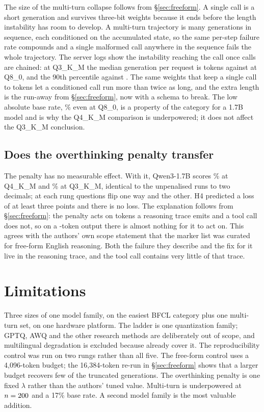 \documentclass[11pt]{article}
\newcommand{\bfcl}{BFCL}
\newcommand{\qm}{Qwen3-1.7B}
\begin{document}
The size of the multi-turn collapse follows from \S\ref{sec:freeform}. A single call is a short generation and survives three-bit weights because it ends before the length instability has room to develop. A multi-turn trajectory is many generations in sequence, each conditioned on the accumulated state, so the same per-step failure rate compounds and a single malformed call anywhere in the sequence fails the whole trajectory. The server logs show the instability reaching the call once calls are chained: at Q3\_K\_M the median generation per request is \qtMtNgenMedThree{} tokens against \qtMtNgenMedEight{} at Q8\_0, and the 90th percentile \qtMtNgenPninezeroThree{} against \qtMtNgenPninezeroEight{}. The same weights that keep a single call to \qtToolNgenMedThree{} tokens let a conditioned call run more than twice as long, and the extra length is the run-away from \S\ref{sec:freeform}, now with a schema to break. The low absolute base rate, \qtMtAccEight{}\% even at Q8\_0, is a property of the category for a 1.7B model and is why the Q4\_K\_M comparison is underpowered; it does not affect the Q3\_K\_M conclusion.

\subsection{Does the overthinking penalty transfer}

The penalty has no measurable effect. With it, \qm{} scores \qtHfourAccFour{}\% at Q4\_K\_M and \qtHfourAccThree{}\% at Q3\_K\_M, identical to the unpenalised runs to two decimals; at each rung \qtHfourLostFour{} questions flip one way and \qtHfourGainedFour{} the other. H4 predicted a loss of at least three points and there is no loss. The explanation follows from \S\ref{sec:freeform}: the penalty acts on tokens a reasoning trace emits and a tool call does not, so on a \qtToolNgenMedThree{}-token output there is almost nothing for it to act on. This agrees with the authors' own scope statement that the marker list was curated for free-form English reasoning. Both the failure they describe and the fix for it live in the reasoning trace, and the tool call contains very little of that trace.

\section{Limitations}

Three sizes of one model family, on the easiest \bfcl{} category plus one multi-turn set, on one hardware platform. The ladder is one quantization family; GPTQ, AWQ and the other research methods are deliberately out of scope, and multilingual degradation is excluded because \citet{marchisio2024multilingual} already cover it. The reproducibility control was run on two rungs rather than all five. The free-form control uses a 4{,}096-token budget; the 16{,}384-token re-run in \S\ref{sec:freeform} shows that a larger budget recovers few of the \qtGsmTruncThree{} truncated generations. The overthinking penalty is one fixed $\lambda$ rather than the authors' tuned value. Multi-turn is underpowered at $n=200{}$ and a 17\% base rate. A second model family is the most valuable addition.
\end{document}

